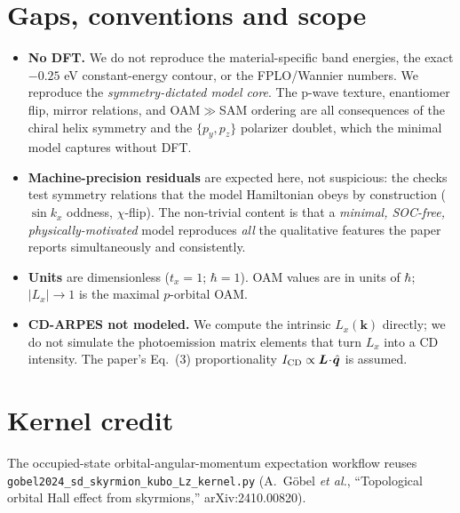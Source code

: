 \documentclass[aps,prl,twocolumn,superscriptaddress,floatfix]{revtex4-2}
\begin{document}
\section{Gaps, conventions and scope}
\begin{itemize}
\item \textbf{No DFT.} We do not reproduce the material-specific band energies,
the exact $-0.25$ eV constant-energy contour, or the FPLO/Wannier numbers. We
reproduce the \emph{symmetry-dictated model core}. The p-wave texture,
enantiomer flip, mirror relations, and OAM$\gg$SAM ordering are all consequences
of the chiral helix symmetry and the $\{p_y,p_z\}$ polarizer doublet, which the
minimal model captures without DFT.
\item \textbf{Machine-precision residuals} are expected here, not suspicious:
the checks test symmetry relations that the model Hamiltonian obeys by
construction ($\sin k_x$ oddness, $\chi$-flip). The non-trivial content is that
a \emph{minimal, SOC-free, physically-motivated} model reproduces \emph{all}
the qualitative features the paper reports simultaneously and consistently.
\item \textbf{Units} are dimensionless ($t_x=1$; $\hbar=1$). OAM values are in
units of $\hbar$; $|L_x|\to1$ is the maximal $p$-orbital OAM.
\item \textbf{CD-ARPES not modeled.} We compute the intrinsic $L_x(\bm{k})$
directly; we do not simulate the photoemission matrix elements that turn $L_x$
into a CD intensity. The paper's Eq.~(3) proportionality
$I_{\rm CD}\propto\bm{L}\!\cdot\!\hat{\bm q}$ is assumed.
\end{itemize}

\section*{Kernel credit}
The occupied-state orbital-angular-momentum expectation workflow reuses
\texttt{gobel2024\_sd\_skyrmion\_kubo\_Lz\_kernel.py} (A.~G\"obel \textit{et
al.}, ``Topological orbital Hall effect from skyrmions,'' arXiv:2410.00820).
\end{document}
